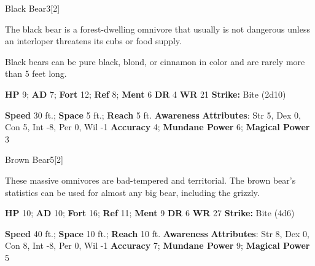   \begin{monsection}{Black Bear}{3}[2]
    \vspace{-1em}\vspace{-1em}
    \vspace{0em}

    
      The black bear is a forest-dwelling omnivore that usually is not dangerous unless an interloper threatens its cubs or food supply.

      Black bears can be pure black, blond, or cinnamon in color and are rarely more than 5 feet long.
    

    \begin{spellcontent}
      \begin{spelltargetinginfo}
        \pari \textbf{HP} 9;
          \textbf{AD} 7;
          \textbf{Fort} 12;
          \textbf{Ref} 8;
          \textbf{Ment} 6
        \pari \textbf{DR} 4
        \pari \textbf{WR} 21
        \pari \textbf{Strike:}
            Bite  (2d10)
      \end{spelltargetinginfo}
    \end{spellcontent}
    \begin{monsterfooter}
      \pari \textbf{Speed} 30 ft.;
        \textbf{Space} 5 ft.;
        \textbf{Reach} 5 ft.
      \pari \textbf{Awareness} 
      \pari \textbf{Attributes}:
        Str 5, Dex 0,
        Con 5, Int -8,
        Per 0, Wil -1
      \pari \textbf{Accuracy} 4;
        \textbf{Mundane Power} 6;
      \textbf{Magical Power} 3
    \end{monsterfooter}
  \end{monsection}
  
  
  \begin{monsection}{Brown Bear}{5}[2]
    \vspace{-1em}\vspace{-1em}
    \vspace{0em}

    
      These massive omnivores are bad-tempered and territorial.
      The brown bear's statistics can be used for almost any big bear, including the grizzly.
    

    \begin{spellcontent}
      \begin{spelltargetinginfo}
        \pari \textbf{HP} 10;
          \textbf{AD} 10;
          \textbf{Fort} 16;
          \textbf{Ref} 11;
          \textbf{Ment} 9
        \pari \textbf{DR} 6
        \pari \textbf{WR} 27
        \pari \textbf{Strike:}
            Bite  (4d6)
      \end{spelltargetinginfo}
    \end{spellcontent}
    \begin{monsterfooter}
      \pari \textbf{Speed} 40 ft.;
        \textbf{Space} 10 ft.;
        \textbf{Reach} 10 ft.
      \pari \textbf{Awareness} 
      \pari \textbf{Attributes}:
        Str 8, Dex 0,
        Con 8, Int -8,
        Per 0, Wil -1
      \pari \textbf{Accuracy} 7;
        \textbf{Mundane Power} 9;
      \textbf{Magical Power} 5
    \end{monsterfooter}
  \end{monsection}
  
